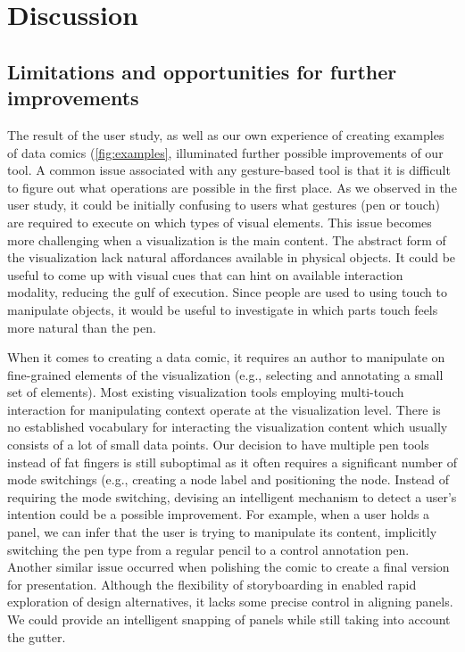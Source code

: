 \section{Discussion}

\subsection{Limitations and opportunities for further improvements}
The result of the user study, as well as our own experience of creating examples of data comics (\autoref{fig:examples}, illuminated further possible improvements of our tool. A common issue associated with any gesture-based tool is that it is difficult to figure out what operations are possible in the first place. As we observed in the user study, it could be initially confusing to users what gestures (pen or touch) are required to execute on which types of visual elements. This issue becomes more challenging when a visualization is the main content. The abstract form of the visualization lack natural affordances available in physical objects. It could be useful to come up with visual cues that can hint on available interaction modality, reducing the gulf of execution. Since people are used to using touch to manipulate objects, it would be useful to investigate in which parts touch feels more natural than the pen. 

When it comes to creating a data comic, it requires an author to manipulate on fine-grained elements of the visualization (e.g., selecting and annotating a small set of elements). Most existing visualization tools employing multi-touch interaction for manipulating context operate at the visualization level. There is no established vocabulary for interacting the visualization content which usually consists of a  lot of small data points. Our decision to have multiple pen tools instead of fat fingers is still suboptimal as it often requires a significant number of mode switchings (e.g., creating a node label and positioning the node. Instead of requiring the mode switching, devising an intelligent mechanism to detect a user's intention could be a possible improvement. For example, when a user holds a panel, we can infer that the user is trying to manipulate its content, implicitly switching the pen type from a regular pencil to a control annotation pen. Another similar issue occurred when polishing the comic to create a final version for presentation. Although the flexibility of storyboarding in \toolname{} enabled rapid exploration of design alternatives, it lacks some precise control in aligning panels. We could provide an intelligent snapping of panels while still taking into account the gutter.

